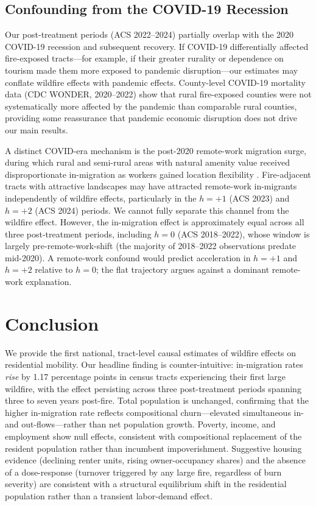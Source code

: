 \documentclass[12pt]{article}
\begin{document}
\subsection{Confounding from the COVID-19 Recession}

Our post-treatment periods (ACS 2022--2024) partially overlap with
the 2020 COVID-19 recession and subsequent recovery.
If COVID-19 differentially affected fire-exposed tracts---for example,
if their greater rurality or dependence on tourism made them
more exposed to pandemic disruption---our estimates may conflate
wildfire effects with pandemic effects.
County-level COVID-19 mortality data (CDC WONDER, 2020--2022) show
that rural fire-exposed counties were not systematically more affected
by the pandemic than comparable rural counties, providing some reassurance
that pandemic economic disruption does not drive our main results.

A distinct COVID-era mechanism is the post-2020 remote-work migration
surge, during which rural and semi-rural areas with natural amenity value
received disproportionate in-migration as workers gained location
flexibility \citep{ramani2021work}.
Fire-adjacent tracts with attractive landscapes may have attracted
remote-work in-migrants independently of wildfire effects, particularly
in the $h = +1$ (ACS 2023) and $h = +2$ (ACS 2024) periods.
We cannot fully separate this channel from the wildfire effect.
However, the in-migration effect is approximately equal across all three
post-treatment periods, including $h = 0$ (ACS 2018--2022), whose window
is largely pre-remote-work-shift (the majority of 2018--2022 observations
predate mid-2020).
A remote-work confound would predict acceleration in $h = +1$ and $h = +2$
relative to $h = 0$; the flat trajectory argues against a dominant
remote-work explanation.


\section{Conclusion}
\label{sec:conclusion}

We provide the first national, tract-level causal estimates of wildfire
effects on residential mobility.
Our headline finding is counter-intuitive: in-migration rates
\emph{rise} by 1.17 percentage points in census tracts experiencing
their first large wildfire, with the effect persisting across three
post-treatment periods spanning three to seven years post-fire.
Total population is unchanged, confirming that the higher in-migration
rate reflects compositional churn---elevated simultaneous in- and
out-flows---rather than net population growth.
Poverty, income, and employment show null effects, consistent with
compositional replacement of the resident population rather than
incumbent impoverishment.
Suggestive housing evidence (declining renter units, rising
owner-occupancy shares) and the absence of a dose-response
(turnover triggered by any large fire, regardless of burn severity)
are consistent with a structural equilibrium shift in the residential
population rather than a transient labor-demand effect.
\end{document}

